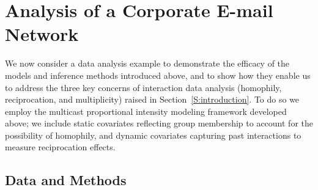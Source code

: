 \documentclass[final]{statsoc}
\begin{document}
\section{Analysis of a Corporate E-mail Network}\label{S:enron-modeling}

We now consider a data analysis example to demonstrate the efficacy of the
models and inference methods introduced above, and to show how they enable
us to address the three key concerns of interaction data analysis
(homophily, reciprocation, and multiplicity) raised in
Section~\ref{S:introduction}.  To do so we employ the multicast
proportional intensity modeling framework developed above; we include static
covariates reflecting group membership to account for the possibility of
homophily, and dynamic covariates capturing past interactions to measure
reciprocation effects.

\subsection{Data and Methods}
\end{document}
